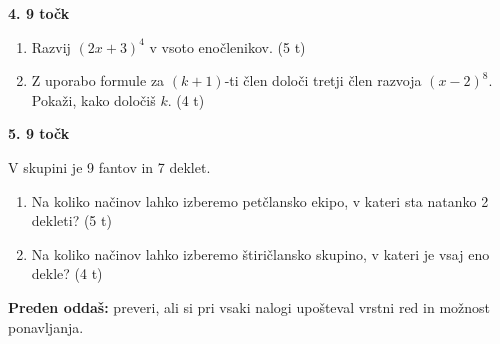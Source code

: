 \documentclass[11pt,a4paper]{article}
\newenvironment{taskbox}[1]{%
    \par\addvspace{8pt}%
    \noindent\textbf{\large #1}\par
}{\par\addvspace{4pt}}
\newcommand{\work}[1]{\par\vspace{#1}}
\begin{document}
\clearpage
\begin{taskbox}{4. \hfill 9 točk}
\begin{enumerate}[label=\alph*)]
    \item Razvij \((2x+3)^4\) v vsoto enočlenikov. \hfill (5 t)
    \work{7cm}
    \item Z uporabo formule za \((k+1)\)-ti člen določi tretji člen razvoja
    \((x-2)^8\). Pokaži, kako določiš \(k\). \hfill (4 t)
    \work{7cm}
\end{enumerate}
\end{taskbox}

\clearpage
\begin{taskbox}{5. \hfill 9 točk}
V skupini je 9 fantov in 7 deklet.
\begin{enumerate}[label=\alph*)]
    \item Na koliko načinov lahko izberemo petčlansko ekipo, v kateri sta
    natanko 2 dekleti? \hfill (5 t)
    \work{7cm}
    \item Na koliko načinov lahko izberemo štiričlansko skupino, v kateri je vsaj eno dekle? \hfill (4 t)
    \work{2.5cm}
\end{enumerate}
\end{taskbox}

\vfill
\begin{center}
    \textbf{Preden oddaš:} preveri, ali si pri vsaki nalogi upošteval vrstni red
    in možnost ponavljanja.
\end{center}
\end{document}
